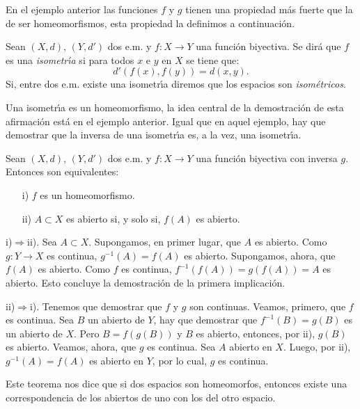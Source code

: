 En el ejemplo anterior las funciones $f$ y $g$ tienen una
propiedad m\'as fuerte que la de ser homeomorfismos, esta
propiedad la definimos a continuaci\'on.
\begin{definicion} Sean $(X,d)$, $(Y,d')$ dos e.m. y
$f:X\rightarrow Y$ una funci\'on biyectiva. Se dir\'a que $f$ es
una \emph{isometr\'{\i}a} si para todos $x$ e $y$ en $X$ se tiene
que:
\[
    d'(f(x),f(y))=d(x,y).
\]
Si, entre dos e.m. existe una isometr\'{\i}a diremos que los
espacios son \emph{isom\'etricos}.
\end{definicion}

Una isometr\'{\i}a es un homeomorfismo, la idea central de la
demostraci\'on de esta afirmaci\'on est\'a en el ejemplo anterior.
Igual que en aquel ejemplo, hay que demostrar que la inversa de
una isometr\'{\i}a es, a la vez, una isometr\'{\i}a.

\begin{proposicion} Sean $(X,d)$, $(Y,d')$ dos e.m. y
$f:X\rightarrow Y$ una funci\'on biyectiva con inversa $g$.
Entonces son equivalentes:
\begin{itemize}
\item[i)] $f$ es un homeomorfismo.
\item[ii)] $A\subset X$ es abierto si, y solo si, $f(A)$ es
abierto.
\end{itemize}
\end{proposicion}
\begin{demo} i)$\Rightarrow$ii). Sea $A\subset X$. Supongamos, en primer lugar,
que $A$ es abierto. Como $g:Y\rightarrow X$ es continua,
$g^{-1}(A)=f(A)$ es abierto. Supongamos, ahora, que $f(A)$ es
abierto. Como $f$ es continua, $f^{-1}(f(A))=g(f(A))=A$ es
abierto. Esto concluye la demostraci\'on de la primera
implicaci\'on.

ii)$\Rightarrow$i). Tenemos que demostrar que $f$ y $g$ son
continuas. Veamos, primero, que $f$ es continua. Sea $B$ un
abierto de $Y$, hay que demostrar que $f^{-1}(B)=g(B)$ es un
abierto de $X$. Pero $B=f(g(B))$ y $B$ es abierto, entonces, por
ii), $g(B)$ es abierto. Veamos, ahora, que $g$ es continua. Sea
$A$ abierto en $X$. Luego, por ii), $g^{-1}(A)=f(A)$ es abierto en
$Y$, por lo cual, $g$ es continua.
\end{demo}

Este teorema nos dice que si dos espacios son homeomorfos,
entonces existe una correspondencia de los abiertos de uno con los
del otro espacio.

